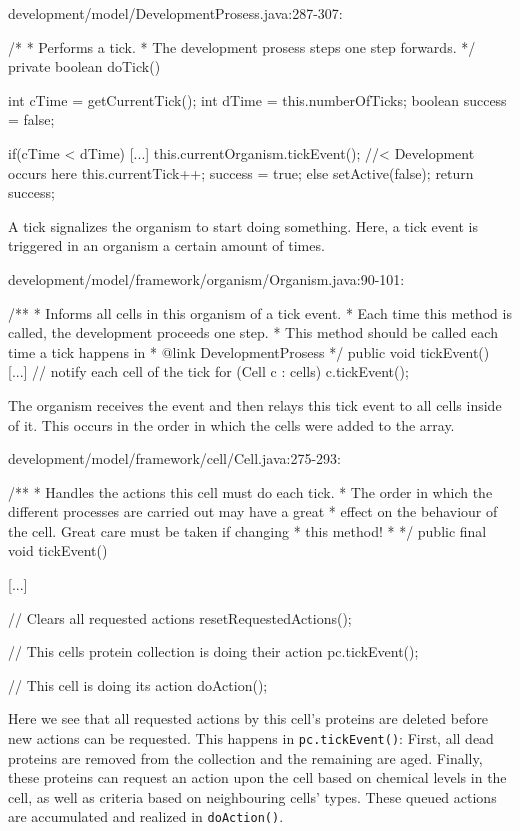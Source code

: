 \begin{verbatimtab}
development/model/DevelopmentProsess.java:287-307:

/*
 * Performs a tick.
 * The development prosess steps one step forwards.
 */
private boolean doTick() {
	int cTime = getCurrentTick();
	int dTime = this.numberOfTicks;
	boolean success = false;

	if(cTime < dTime) {
		[...]
		this.currentOrganism.tickEvent(); //< Development occurs here
		this.currentTick++;
		success = true;
	} else {
		setActive(false);
	}
	return success;
}
\end{verbatimtab}

A tick signalizes the organism to start doing something. Here, a tick event is triggered in an organism a certain amount of times.

\begin{verbatimtab}
development/model/framework/organism/Organism.java:90-101:

/**
 * Informs all cells in this organism of a tick event.
 * Each time this method is called, the development proceeds one step.
 * This method should be called each time a tick happens in
 * {@link DevelopmentProsess}
 */
public void tickEvent() {
	[...]
	// notify each cell of the tick
	for (Cell c : cells) {
		c.tickEvent();
	}
}
\end{verbatimtab}

The organism receives the event and then relays this tick event to all cells inside of it. This occurs in the order in which the cells were added to the array.

\begin{verbatimtab}
development/model/framework/cell/Cell.java:275-293:

/**
 * Handles the actions this cell must do each tick.
 * The order in which the different processes are carried out may have a great
 * effect on the behaviour of the cell. Great care must be taken if changing
 * this method!
 *
 */
public final void tickEvent() {
	[...]

	// Clears all requested actions
	resetRequestedActions();

	// This cells protein collection is doing their action
	pc.tickEvent();

	// This cell is doing its action
	doAction();
}
\end{verbatimtab}

Here we see that all requested actions by this cell's proteins are deleted before new actions can be requested. This happens in \texttt{pc.tickEvent()}: First, all dead proteins are removed from the collection and the remaining are aged. Finally, these proteins can request an action upon the cell based on chemical levels in the cell, as well as criteria based on neighbouring cells' types. These queued actions are accumulated and realized in \texttt{doAction()}.

